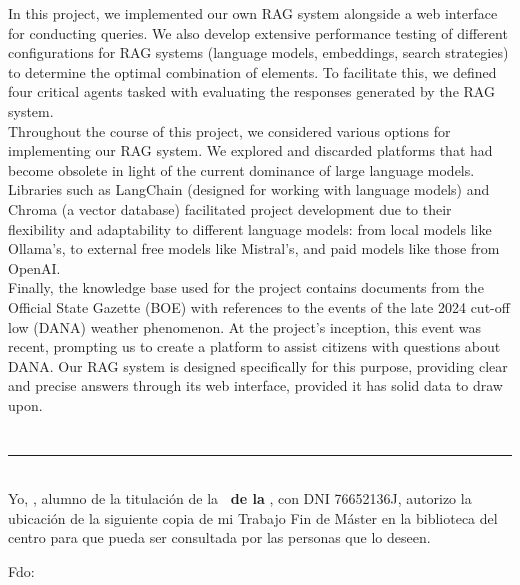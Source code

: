 \noindent In this project, we implemented our own RAG system alongside a web interface for conducting queries. We also develop extensive performance testing of different configurations for RAG systems (language models, embeddings, search strategies) to determine the optimal combination of elements. To facilitate this, we defined four critical agents tasked with evaluating the responses generated by the RAG system.\\

\noindent Throughout the course of this project, we considered various options for implementing our RAG system. We explored and discarded platforms that had become obsolete in light of the current dominance of large language models. Libraries such as LangChain (designed for working with language models) and Chroma (a vector database) facilitated project development due to their flexibility and adaptability to different language models: from local models like Ollama's, to external free models like Mistral's, and paid models like those from OpenAI.\\

\noindent Finally, the knowledge base used for the project contains documents from the Official State Gazette (BOE) with references to the events of the late 2024 cut-off low (DANA) weather phenomenon. At the project's inception, this event was recent, prompting us to create a platform to assist citizens with questions about DANA. Our RAG system is designed specifically for this purpose, providing clear and precise answers through its web interface, provided it has solid data to draw upon.

\chapter*{}
\thispagestyle{empty}

\noindent\rule[-1ex]{\textwidth}{2pt}\\[4.5ex]

Yo, \textbf{\myName}, alumno de la titulación \myDegree de la \textbf{\myFaculty \ de la \myUni}, con DNI 76652136J, autorizo la ubicación de la siguiente copia de mi Trabajo Fin de Máster en la biblioteca del centro para que pueda ser
consultada por las personas que lo deseen.

\vspace{6cm}

\noindent Fdo: \myName

\vspace{2cm}

